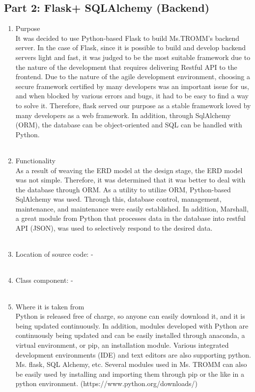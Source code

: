 \documentclass[conference]{IEEEtran}
\begin{document}
\subsection{Part 2: Flask+ SQLAlchemy (Backend)}
\begin{enumerate}
    \item Purpose\\
    It was decided to use Python-based Flask to build Ms.TROMM's backend server. In the case of Flask, since it is possible to build and develop backend servers light and fast, it was judged to be the most suitable framework due to the nature of the development that requires delivering Restful API to the frontend. Due to the nature of the agile development environment, choosing a secure framework certified by many developers was an important issue for us, and when blocked by various errors and bugs, it had to be easy to find a way to solve it. Therefore, flask served our purpose as a stable framework loved by many developers as a web framework. In addition, through SqlAlchemy (ORM), the database can be object-oriented and SQL can be handled with Python.\\ \\
    \item Functionality\\
    As a result of weaving the ERD model at the design stage, the ERD model was not simple. Therefore, it was determined that it was better to deal with the database through ORM. As a utility to utilize ORM, Python-based SqlAlchemy was used. Through this, database control, management, maintenance, and maintenance were easily established. In addition, Marshall, a great module from Python that processes data in the database into restful API (JSON), was used to selectively respond to the desired data.\\ \\
    \item Location of source code:  - \\ \\
    \item Class component: - \\ \\
    \item Where it is taken from\\
    Python is released free of charge, so anyone can easily download it, and it is being updated continuously. In addition, modules developed with Python are continuously being updated and can be easily installed through anaconda, a virtual environment, or pip, an installation module. Various integrated development environments (IDE) and text editors are also supporting python. Ms. flask, SQL Alchemy, etc. Several modules used in Ms. TROMM can also be easily used by installing and importing them through pip or the like in a python environment. (https://www.python.org/downloads/) \\ \\

\end{enumerate}
\end{document}
